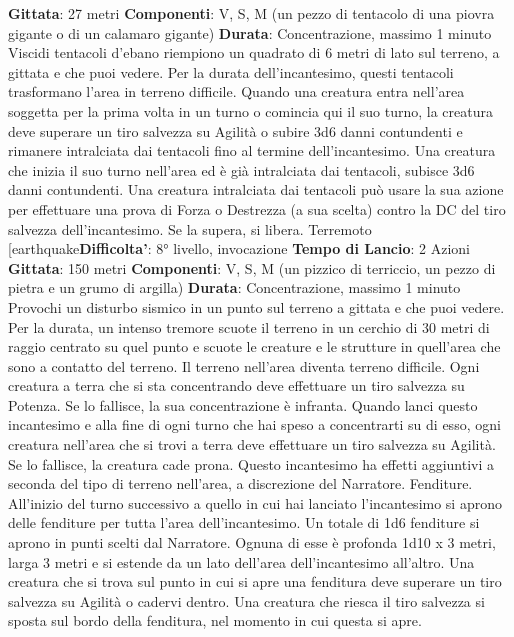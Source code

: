 \begin{multicols}{2}
\textbf{Gittata}: 27 metri
\textbf{Componenti}: V, S, M (un pezzo di tentacolo di una
piovra gigante o di un calamaro gigante)
\textbf{Durata}: Concentrazione, massimo 1 minuto
Viscidi tentacoli d’ebano riempiono un quadrato di 6
metri di lato sul terreno, a gittata e che puoi vedere. Per
la durata dell’incantesimo, questi tentacoli trasformano
l’area in terreno difficile.
Quando una creatura entra nell’area soggetta per la
prima volta in un turno o comincia qui il suo turno, la
creatura deve superare un tiro salvezza su Agilità o
subire 3d6 danni contundenti e rimanere intralciata dai
tentacoli fino al termine dell’incantesimo. Una creatura
che inizia il suo turno nell’area ed è già intralciata dai
tentacoli, subisce 3d6 danni contundenti.
Una creatura intralciata dai tentacoli può usare la sua
azione per effettuare una prova di Forza o Destrezza (a
sua scelta) contro la DC del tiro salvezza
dell’incantesimo. Se la supera, si libera.
Terremoto
[earthquake\textbf{Difficolta'}:
8° livello, invocazione
\textbf{Tempo di Lancio}: 2 Azioni
\textbf{Gittata}: 150 metri
\textbf{Componenti}: V, S, M (un pizzico di terriccio, un pezzo
di pietra e un grumo di argilla)
\textbf{Durata}: Concentrazione, massimo 1 minuto
Provochi un disturbo sismico in un punto sul terreno a
gittata e che puoi vedere. Per la durata, un intenso
tremore scuote il terreno in un cerchio di 30 metri di
raggio centrato su quel punto e scuote le creature e le
strutture in quell’area che sono a contatto del terreno.
Il terreno nell’area diventa terreno difficile. Ogni
creatura a terra che si sta concentrando deve effettuare
un tiro salvezza su Potenza. Se lo fallisce, la sua
concentrazione è infranta.
Quando lanci questo incantesimo e alla fine di ogni
turno che hai speso a concentrarti su di esso, ogni
creatura nell’area che si trovi a terra deve effettuare un
tiro salvezza su Agilità. Se lo fallisce, la creatura
cade prona.
Questo incantesimo ha effetti aggiuntivi a seconda del
tipo di terreno nell’area, a discrezione del Narratore.
Fenditure. All’inizio del turno successivo a quello in cui
hai lanciato l’incantesimo si aprono delle fenditure per
tutta l’area dell’incantesimo. Un totale di 1d6 fenditure si
aprono in punti scelti dal Narratore. Ognuna di esse è
profonda 1d10 x 3 metri, larga 3 metri e si estende da
un lato dell’area dell’incantesimo all’altro. Una creatura
che si trova sul punto in cui si apre una fenditura deve
superare un tiro salvezza su Agilità o cadervi
dentro. Una creatura che riesca il tiro salvezza si sposta
sul bordo della fenditura, nel momento in cui questa si
apre.

\end{multicols}
